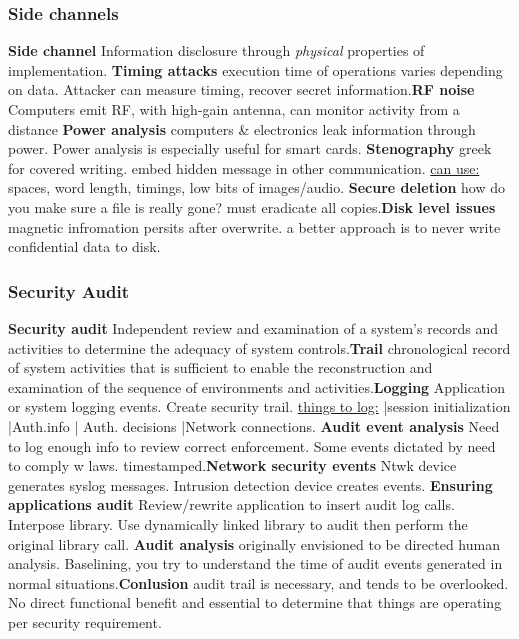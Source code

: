 \documentclass[a4paper,1pt]{article}
\begin{document}
\subsubsection{Side channels}
{\bf Side channel} Information disclosure through \emph{physical} properties of implementation. {\bf Timing attacks} execution time of operations varies depending on data. Attacker can measure timing, recover secret information.{\bf RF noise} Computers emit RF, with high-gain antenna, can monitor activity from a distance {\bf Power analysis} computers & electronics leak information through power. Power analysis is especially useful for smart cards. {\bf Stenography} greek for covered writing. embed hidden message in other communication. \underline{can use:} spaces, word length, timings, low bits of images/audio. {\bf Secure deletion} how do you make sure a file is really gone? must eradicate all copies.{\bf Disk level issues} magnetic infromation persits after overwrite. a better approach is to never write confidential data to disk.
\subsubsection{Security Audit}
{\bf Security audit} Independent review and examination of a system's records and activities to determine the adequacy of system controls.{\bf Trail} chronological record of system activities that is sufficient to enable the reconstruction and examination of the sequence of environments and activities.{\bf Logging} Application or system logging events. Create security trail. \underline{things to log:} |session initialization |Auth.info | Auth. decisions |Network connections. {\bf Audit event analysis} Need to log enough info to review correct enforcement. Some events dictated by need to comply w laws. timestamped.{\bf Network security events} Ntwk device generates syslog messages. Intrusion detection device creates events. {\bf Ensuring applications audit} Review/rewrite application to insert audit log calls. Interpose library. Use dynamically linked library to audit then perform the original library call. {\bf Audit analysis} originally envisioned to be directed human analysis. Baselining, you try to understand the time of audit events generated in normal situations.{\bf Conlusion} audit trail is necessary, and tends to be overlooked. No direct functional benefit and essential to determine that things are operating per security requirement.
\end{document}
